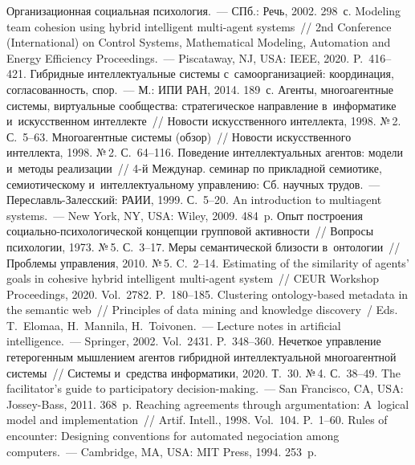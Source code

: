 \begin{multicols}{2}
{\small\frenchspacing
{%
\begin{thebibliography}{99}
   Организационная социальная психология.~--- СПб.: Речь, 2002. 298~с.
   Modeling team cohesion using hybrid intelligent multi-agent systems~// 2nd 
 Conference (International) on Control Systems, Mathematical Modeling, Automation and Energy 
Efficiency Proceedings.~--- Piscataway, NJ, USA: IEEE, 2020. P.~416--421.
   Гибридные интеллектуальные 
системы с~самоорганизацией: координация, согласованность, спор.~--- М.: ИПИ РАН, 2014. 
189~с.
   Агенты, многоагентные системы, виртуальные сообщества: 
стратегическое направление в~информатике и~искусственном интеллекте~// Новости 
искусственного интеллекта, 1998. №\,2. С.~5--63.
   Многоагентные системы (обзор)~// 
Новости искусственного интеллекта, 1998. №\,2. С.~64--116.
   Поведение интеллектуальных агентов: модели и~методы 
реализации~// 4-й Междунар. семинар по прикладной семиотике, семиотическому 
и~интеллектуальному управлению: Сб. научных трудов.~--- Пе\-ре\-славль-За\-лес\-ский: РАИИ, 1999. 
С.~5--20.
   An introduction to multiagent systems.~--- New York, NY, 
  USA: Wiley,  2009. 484~p.
   Опыт построения социально-пси\-хо\-ло\-ги\-че\-ской концепции 
групповой ак\-тив\-ности~// Вопросы психологии, 1973. №\,5. С.~3--17.
   Меры 
семантической близости в~онтологии~// Проб\-ле\-мы управ\-ле\-ния, 2010. №\,5. C.~2--14.
   Estimating of the similarity of agents' goals in cohesive hybrid intelligent 
multi-agent system~// CEUR Workshop Proceedings, 2020. Vol.~2782. P.~180--185.
   Clustering ontology-based metadata in the semantic web~// 
  Principles of data mining and knowledge discovery~/
  Eds. T.~Elomaa, H.~Mannila, H.~Toivonen.~---
  Lecture notes in artificial intelligence.~--- Springer, 2002. Vol.~2431.
  P.~348--360.
   Нечеткое управление гетерогенным мышлением 
агентов гибридной интеллектуальной многоагентной системы~// Системы и~средства 
информатики, 2020. Т.~30. №\,4. С.~38--49.
   The facilitator's guide to participatory 
decision-making.~--- San Francisco, CA, USA: Jossey-Bass, 2011. 368~p.
   Reaching agreements through argumentation: A~logical 
model and implementation~// Artif. Intell., 1998. Vol.~104. P.~1--60.
   Rules of encounter: Designing conventions for automated 
negociation among computers.~--- Cambridge, MA, USA: MIT Press, 1994. 253~p.
  \end{thebibliography}

}}
\end{multicols}
